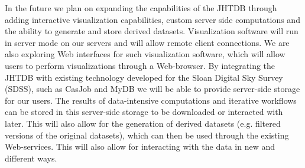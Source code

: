 \documentclass[10pt,twocolumn]{article}
\begin{document}
In the future we plan on expanding the capabilities of the JHTDB through adding interactive visualization capabilities, custom server side computations and
the ability	to generate and store derived datasets. Visualization software will run in server
mode on our servers and will allow remote client connections. We are also exploring Web interfaces for such visualization software, which will allow users
to perform visualizations through a Web-browser. By integrating the JHTDB with existing technology developed for the Sloan Digital Sky Survey (SDSS), such
as CasJob and MyDB \cite{LiThakar} we will be able to provide server-side storage for our users. The results of data-intensive computations and iterative 
workflows can be stored in this server-side storage to be downloaded or interacted with later. This will also allow for the generation of derived datasets (e.g.
filtered versions of the original datasets), which can then be used through the existing Web-services. This will also allow for interacting with the data in new
and different ways.

\vfill
\newpage
 

\vfill

\newpage
   
 
\end{document}
